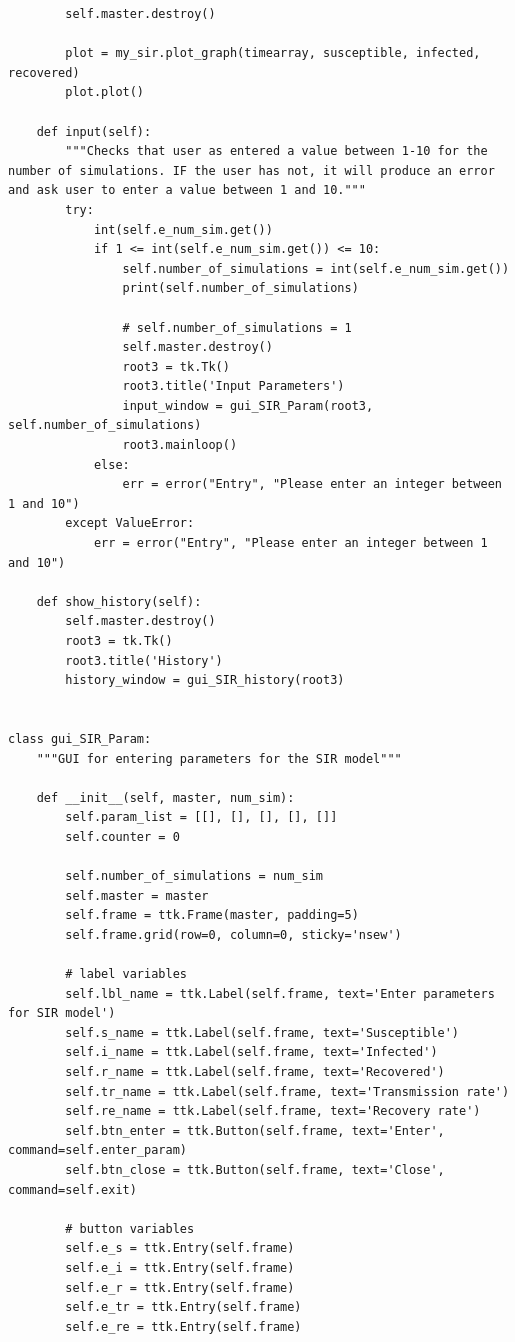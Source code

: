 \documentclass[11pt, a4paper]{article}
\begin{document}
\begin{lstlisting}
        self.master.destroy()

        plot = my_sir.plot_graph(timearray, susceptible, infected, recovered)
        plot.plot()

    def input(self):
        """Checks that user as entered a value between 1-10 for the number of simulations. IF the user has not, it will produce an error and ask user to enter a value between 1 and 10."""
        try:
            int(self.e_num_sim.get())
            if 1 <= int(self.e_num_sim.get()) <= 10:
                self.number_of_simulations = int(self.e_num_sim.get())
                print(self.number_of_simulations)

                # self.number_of_simulations = 1
                self.master.destroy()
                root3 = tk.Tk()
                root3.title('Input Parameters')
                input_window = gui_SIR_Param(root3, self.number_of_simulations)
                root3.mainloop()
            else:
                err = error("Entry", "Please enter an integer between 1 and 10")
        except ValueError:
            err = error("Entry", "Please enter an integer between 1 and 10")

    def show_history(self):
        self.master.destroy()
        root3 = tk.Tk()
        root3.title('History')
        history_window = gui_SIR_history(root3)


class gui_SIR_Param:
    """GUI for entering parameters for the SIR model"""

    def __init__(self, master, num_sim):
        self.param_list = [[], [], [], [], []]
        self.counter = 0

        self.number_of_simulations = num_sim
        self.master = master
        self.frame = ttk.Frame(master, padding=5)
        self.frame.grid(row=0, column=0, sticky='nsew')

        # label variables
        self.lbl_name = ttk.Label(self.frame, text='Enter parameters for SIR model')
        self.s_name = ttk.Label(self.frame, text='Susceptible')
        self.i_name = ttk.Label(self.frame, text='Infected')
        self.r_name = ttk.Label(self.frame, text='Recovered')
        self.tr_name = ttk.Label(self.frame, text='Transmission rate')
        self.re_name = ttk.Label(self.frame, text='Recovery rate')
        self.btn_enter = ttk.Button(self.frame, text='Enter', command=self.enter_param)
        self.btn_close = ttk.Button(self.frame, text='Close', command=self.exit)

        # button variables
        self.e_s = ttk.Entry(self.frame)
        self.e_i = ttk.Entry(self.frame)
        self.e_r = ttk.Entry(self.frame)
        self.e_tr = ttk.Entry(self.frame)
        self.e_re = ttk.Entry(self.frame)


\end{lstlisting}
\end{document}
